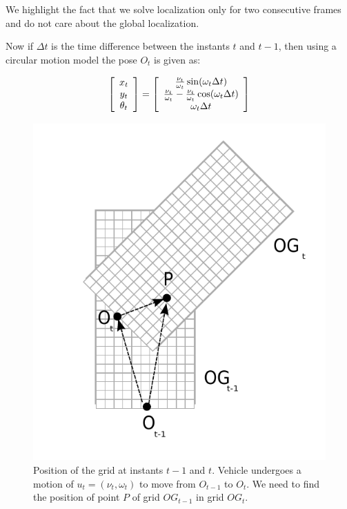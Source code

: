 We highlight the fact that we solve localization only for two consecutive frames and do not care about the global localization. 

Now if $\Delta t$ is the time difference between the instants $t$ and $t-1$, then using a circular motion model the pose $O_t$ is given as:

\begin{equation}
\left[\begin{array}{c}x_t \\ y_t\\ \theta_t \end{array} \right] = 
\left[\begin{array}{c} {\nu_t \over \omega_t} \sin(\omega_t \Delta t) \\ {\nu_t \over \omega_t} - {\nu_t \over \omega_t} \cos(\omega_t \Delta t) \\ \omega_t \Delta t \end{array}\right]
\label{eq:circularmotion}
\end{equation}

\begin{figure}[h]
\begin{center}
\includegraphics[scale=0.8]{img/fig:translation}
\caption{Position of the grid at instants $t-1$ and $t$. Vehicle undergoes a motion of $u_t=(\nu_t, \omega_t)$ to move from $O_{t-1}$ to $O_t$. We need to find the position of point $P$ of grid $OG_{t-1}$ in grid $OG_t$.}
\label{fig:gridmove}
\end{center}
\end{figure}

